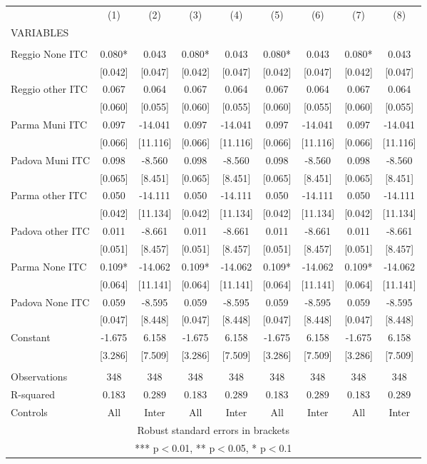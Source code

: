 \begin{tabular}{lcccccccc} \hline
 & (1) & (2) & (3) & (4) & (5) & (6) & (7) & (8) \\
VARIABLES &  &  &  &  &  &  &  &  \\ \hline
 &  &  &  &  &  &  &  &  \\
Reggio None ITC & 0.080* & 0.043 & 0.080* & 0.043 & 0.080* & 0.043 & 0.080* & 0.043 \\
 & [0.042] & [0.047] & [0.042] & [0.047] & [0.042] & [0.047] & [0.042] & [0.047] \\
Reggio other ITC & 0.067 & 0.064 & 0.067 & 0.064 & 0.067 & 0.064 & 0.067 & 0.064 \\
 & [0.060] & [0.055] & [0.060] & [0.055] & [0.060] & [0.055] & [0.060] & [0.055] \\
Parma Muni ITC & 0.097 & -14.041 & 0.097 & -14.041 & 0.097 & -14.041 & 0.097 & -14.041 \\
 & [0.066] & [11.116] & [0.066] & [11.116] & [0.066] & [11.116] & [0.066] & [11.116] \\
Padova Muni ITC & 0.098 & -8.560 & 0.098 & -8.560 & 0.098 & -8.560 & 0.098 & -8.560 \\
 & [0.065] & [8.451] & [0.065] & [8.451] & [0.065] & [8.451] & [0.065] & [8.451] \\
Parma other ITC & 0.050 & -14.111 & 0.050 & -14.111 & 0.050 & -14.111 & 0.050 & -14.111 \\
 & [0.042] & [11.134] & [0.042] & [11.134] & [0.042] & [11.134] & [0.042] & [11.134] \\
Padova other ITC & 0.011 & -8.661 & 0.011 & -8.661 & 0.011 & -8.661 & 0.011 & -8.661 \\
 & [0.051] & [8.457] & [0.051] & [8.457] & [0.051] & [8.457] & [0.051] & [8.457] \\
Parma None ITC & 0.109* & -14.062 & 0.109* & -14.062 & 0.109* & -14.062 & 0.109* & -14.062 \\
 & [0.064] & [11.141] & [0.064] & [11.141] & [0.064] & [11.141] & [0.064] & [11.141] \\
Padova None ITC & 0.059 & -8.595 & 0.059 & -8.595 & 0.059 & -8.595 & 0.059 & -8.595 \\
 & [0.047] & [8.448] & [0.047] & [8.448] & [0.047] & [8.448] & [0.047] & [8.448] \\
Constant & -1.675 & 6.158 & -1.675 & 6.158 & -1.675 & 6.158 & -1.675 & 6.158 \\
 & [3.286] & [7.509] & [3.286] & [7.509] & [3.286] & [7.509] & [3.286] & [7.509] \\
 &  &  &  &  &  &  &  &  \\
Observations & 348 & 348 & 348 & 348 & 348 & 348 & 348 & 348 \\
R-squared & 0.183 & 0.289 & 0.183 & 0.289 & 0.183 & 0.289 & 0.183 & 0.289 \\
 Controls & All & Inter & All & Inter & All & Inter & All & Inter \\ \hline
\multicolumn{9}{c}{ Robust standard errors in brackets} \\
\multicolumn{9}{c}{ *** p$<$0.01, ** p$<$0.05, * p$<$0.1} \\
\end{tabular}
